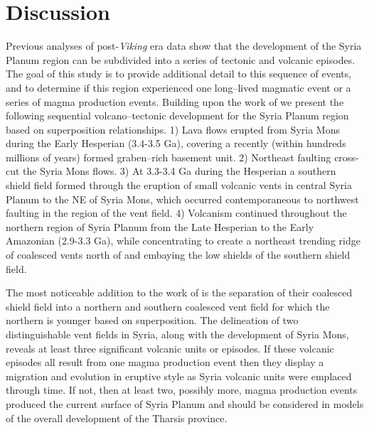 \section{Discussion}

Previous analyses of post-\textit{Viking} era data show that the development of the Syria Planum region can be subdivided into a series of tectonic and volcanic episodes. The goal of this study is to provide additional detail to this sequence of events, and to determine if this region experienced one long--lived magmatic event or a series of magma production events. Building upon the work of \citet{Baptista2008} we present the following sequential volcano--tectonic development for the Syria Planum region based on superposition relationships. 1) Lava flows erupted from Syria Mons during the Early Hesperian (3.4-3.5 Ga), covering a recently (within hundreds millions of years) formed graben--rich basement unit. 2) Northeast faulting cross-cut the Syria Mons flows. 3) At 3.3-3.4 Ga during the Hesperian a southern shield field formed through the eruption of small volcanic vents in central Syria Planum to the NE of Syria Mons, which occurred contemporaneous to northwest faulting in the region of the vent field. 4) Volcanism continued throughout the northern region of Syria Planum from the Late Hesperian to the Early Amazonian (2.9-3.3 Ga), while concentrating to create a northeast trending ridge of coalesced vents north of and embaying the low shields of the southern shield field.

The most noticeable addition to the work of \citet{Baptista2008} is the separation of their coalesced shield field into a northern and southern coalesced vent field for which the northern is younger based on superposition. The delineation of two distinguishable vent fields in Syria, along with the development of Syria Mons, reveals at least three significant volcanic units or episodes. If these volcanic episodes all result from one magma production event then they display a migration and evolution in eruptive style as Syria volcanic units were emplaced through time. If not, then at least two, possibly more, magma production events produced the current surface of Syria Planum and should be considered in models of the overall development of the Tharsis province.

